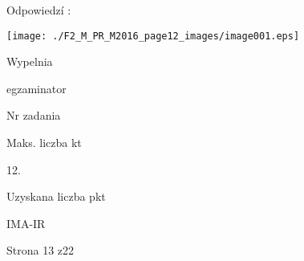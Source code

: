 \documentclass[a4paper,12pt]{article}
\begin{document}
Odpowiedzí :
\begin{center}
\texttt{[image: ./F2\_M\_PR\_M2016\_page12\_images/image001.eps]}
\end{center}
Wypelnia

egzaminator

Nr zadania

Maks. liczba kt

12.

Uzyskana liczba pkt

IMA-IR

Strona 13 z22
\end{document}
